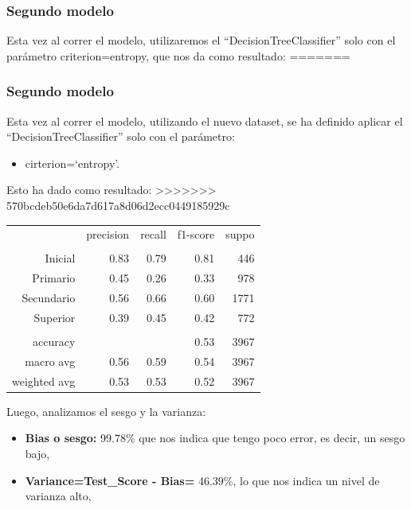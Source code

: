 \documentclass[a4paper]{article}
\begin{document}
        \subsubsection{Segundo modelo}

            Esta vez al correr el modelo, utilizaremos el ``DecisionTreeClassifier'' solo con el parámetro criterion=entropy, que nos da como resultado:  
=======
        \subsubsection{Segundo modelo}

            Esta vez al correr el modelo, utilizando el nuevo dataset, se ha definido aplicar el ``DecisionTreeClassifier'' solo con el parámetro:
            \begin{itemize}
                \item cirterion=`entropy'.
            \end{itemize}

            Esto ha dado como resultado:  
>>>>>>> 570bcdeb50e6da7d617a8d06d2ecc0449185929c

            \begin{table}[H]
                \centering
                \begin{tabular}{rrrrr}
                    ~ & precision & recall & f1-score & suppo \\
                    & & & & \\
                    Inicial    & 0.83 & 0.79 & 0.81 & 446 \\
                    Primario   & 0.45 & 0.26 & 0.33 & 978 \\
                    Secundario & 0.56 & 0.66 & 0.60 & 1771 \\
                    Superior   & 0.39 & 0.45 & 0.42 & 772 \\
                    & & & & \\
                    accuracy & & & 0.53 & 3967 \\
                    macro avg & 0.56 & 0.59 & 0.54 & 3967 \\
                    weighted avg & 0.53 & 0.53 & 0.52 & 3967 \\
                \end{tabular}
            \end{table}

            Luego, analizamos el sesgo y la varianza:
            \begin{itemize}
                \item \textbf{Bias o sesgo:} 99.78\% que nos indica que tengo poco error, es decir, un sesgo bajo,
                \item \textbf{Variance=Test\_Score - Bias=} 46.39\%, lo que nos indica un nivel de varianza alto,
            \end{itemize}
            
\end{document}
